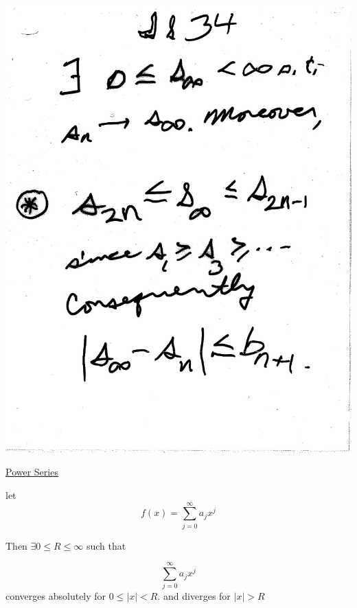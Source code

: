 \documentclass[10pt,a4paper]{article}
\begin{document}
{{\includegraphics[scale=.42]{Pages/IS_34}


\newpage

\huge \underline{Power Series}

\normalsize let $$f(x) = \sum^{\infty}_{j=0}a_jx^j$$

Then $\exists 0\leq R \leq \infty$  such that

$$\sum^{\infty}_{j=0}a_jx^j$$ converges absolutely for $0 \leq |x| < R.$ and diverges for $|x|>R$

}}
\end{document}
